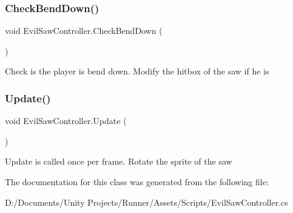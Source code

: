 \subsubsection{\texorpdfstring{Check\+Bend\+Down()}{CheckBendDown()}}
{\footnotesize\ttfamily void Evil\+Saw\+Controller.\+Check\+Bend\+Down (\begin{DoxyParamCaption}{ }\end{DoxyParamCaption})\hspace{0.3cm}{\ttfamily [private]}}

Check is the player is bend down. Modify the hitbox of the saw if he is \mbox{\label{class_evil_saw_controller_ace55f9277b7c17f583ec0fe8b2f674a3}} 
\subsubsection{\texorpdfstring{Update()}{Update()}}
{\footnotesize\ttfamily void Evil\+Saw\+Controller.\+Update (\begin{DoxyParamCaption}{ }\end{DoxyParamCaption})\hspace{0.3cm}{\ttfamily [private]}}

Update is called once per frame. Rotate the sprite of the saw 

The documentation for this class was generated from the following file\+:\begin{DoxyCompactItemize}
\item 
D\+:/\+Documents/\+Unity Projects/\+Runner/\+Assets/\+Scripts/Evil\+Saw\+Controller.\+cs\end{DoxyCompactItemize}
